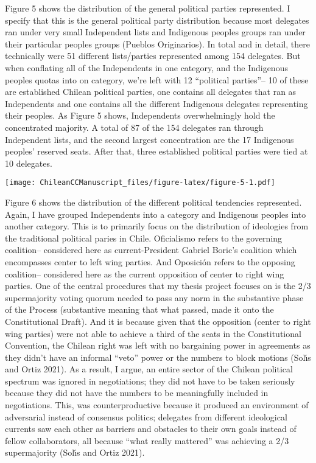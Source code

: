 \documentclass[
]{article}
\begin{document}
Figure 5 shows the distribution of the general political parties
represented. I specify that this is the general political party
distribution because most delegates ran under very small Independent
lists and Indigenous peoples groups ran under their particular peoples
groups (Pueblos Originarios). In total and in detail, there technically
were 51 different lists/parties represented among 154 delegates. But
when conflating all of the Independents in one category, and the
Indigenous peoples quotas into on category, we're left with 12
``political parties''-- 10 of these are established Chilean political
parties, one contains all delegates that ran as Independents and one
contains all the different Indigenous delegates representing their
peoples. As Figure 5 shows, Independents overwhelmingly hold the
concentrated majority. A total of 87 of the 154 delegates ran through
Independent lists, and the second largest concentration are the 17
Indigenous peoples' reserved seats. After that, three established
political parties were tied at 10 delegates.

\texttt{[image: ChileanCCManuscript\_files/figure-latex/figure-5-1.pdf]}

Figure 6 shows the distribution of the different political tendencies
represented. Again, I have grouped Independents into a category and
Indigenous peoples into another category. This is to primarily focus on
the distribution of ideologies from the traditional political paries in
Chile. Oficialismo refers to the governing coalition-- considered here
as current-President Gabriel Boric's coalition which encompasses center
to left wing parties. And Oposición refers to the opposing coalition--
considered here as the current opposition of center to right wing
parties. One of the central procedures that my thesis project focuses on
is the 2/3 supermajority voting quorum needed to pass any norm in the
substantive phase of the Process (substantive meaning that what passed,
made it onto the Constitutional Draft). And it is because given that the
opposition (center to right wing parties) were not able to achieve a
third of the seats in the Constitutional Convention, the Chilean right
was left with no bargaining power in agreements as they didn't have an
informal ``veto'' power or the numbers to block motions (Solı́s and Ortiz
2021). As a result, I argue, an entire sector of the Chilean political
spectrum was ignored in negotiations; they did not have to be taken
seriously because they did not have the numbers to be meaningfully
included in negotiations. This, was counterproductive because it
produced an environment of adversarial instead of consensus politics;
delegates from different ideological currents saw each other as barriers
and obstacles to their own goals instead of fellow collaborators, all
because ``what really mattered'' was achieving a 2/3 supermajority
(Solı́s and Ortiz 2021).
\end{document}
